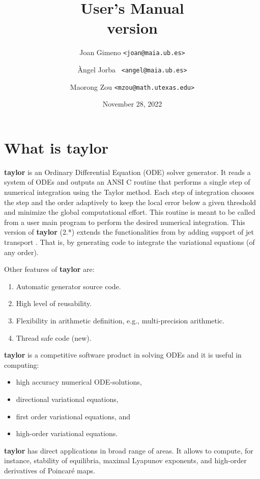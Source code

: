 \documentclass[10pt]{article}
\title{\taylorname{} User's Manual\\[.5em] \normalsize version \version{}}
\author{Joan Gimeno {\tt <joan@maia.ub.es>} \and \`Angel Jorba {\tt
    <angel@maia.ub.es>} \and Maorong Zou {\tt <mzou@math.utexas.edu>}}
\date{November 28, 2022} %
\theoremstyle{remark}
\newcommand{\taylorname}{{\bf taylor}}
\begin{document}
\maketitle

\vspace{-2em}\tableofcontents \newpage %

\section{What is \taylorname{}} \label{sec:whatis}
\taylorname{} is an Ordinary Differential Equation (ODE) solver
generator.  It reads a system of ODEs and outputs an ANSI C routine
that performs a single step of numerical integration using the Taylor
method. Each step of integration chooses the step and the order
adaptively to keep the local error below a given threshold and
minimize the global computational effort.  This routine is meant to be
called from a user main program to perform the desired numerical
integration. This version of \taylorname{} (2.*) extends the
functionalities from \cite{JZ} by adding support of jet transport
\cite{GJJMZ}. That is, by generating code to integrate the variational
equations (of any order).

\smallskip 

Other features of \taylorname{} are:
\begin{enumerate}
\renewcommand{\theenumi}{\roman{enumi}}
    \item Automatic generator source code.
    \item High level of reusability.
    \item Flexibility in arithmetic definition, e.g.,
      multi-precision arithmetic.
    \item Thread safe code ({\sc new}).
\end{enumerate}
\taylorname{} is a competitive software product in solving ODEs and it
is useful in computing:
\begin{itemize}
    \item high accuracy numerical ODE-solutions,
    \item directional variational equations,
    \item first order variational equations, and
    \item high-order variational equations.
\end{itemize}
\taylorname{} has direct applications in broad range of areas.  It
allows to compute, for instance, stability of equilibria, maximal
Lyapunov exponents, and high-order derivatives of Poincar\'e maps.
\end{document}

